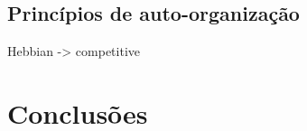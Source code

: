 \documentclass[conference]{IEEEtran}
\begin{document}
	\subsection{Princípios de auto-organização}
	Hebbian -> competitive
	
	
	\section{Conclusões}


    
	
	
\end{document}

